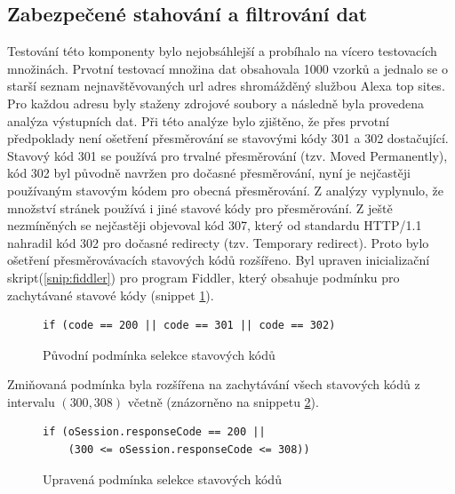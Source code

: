 \documentclass[thesis=M,czech,hidelinks]{FITthesis}[2013/05/06]
\begin{document}
\subsection{Zabezpečené stahování a filtrování dat}
Testování této komponenty bylo nejobsáhlejší a probíhalo na vícero testovacích množinách. Prvotní testovací množina dat obsahovala 1000 vzorků a jednalo se o starší seznam nejnavštěvovaných url adres shromážděný službou Alexa top sites\cite{alexa}. Pro každou adresu byly staženy zdrojové soubory a následně byla provedena analýza výstupních dat. Při této analýze bylo zjištěno, že přes prvotní předpoklady není ošetření přesměrování se stavovými kódy 301 a 302 dostačující. Stavový kód 301 se používá pro trvalné přesměrování (tzv. Moved Permanently), kód 302 byl původně navržen pro dočasné přesměrování, nyní je nejčastěji používaným stavovým kódem pro obecná přesměrování. Z analýzy vyplynulo, že množství stránek používá i jiné stavové kódy pro přesměrování. Z ještě nezmíněných se nejčastěji objevoval kód 307, který od standardu HTTP/1.1 nahradil kód 302 pro dočasné redirecty (tzv. Temporary redirect). Proto bylo ošetření přesměrovávacích stavových kódů rozšířeno. Byl upraven inicializační skript(\ref{snip:fiddler}) pro program Fiddler, který obsahuje podmínku pro zachytávané stavové kódy (snippet \ref{snip:fiddler_new}). 

\begin{figure}[h]               
	\begin{verbatim}
if (code == 200 || code == 301 || code == 302)
	\end{verbatim}      
	\caption{Původní podmínka selekce stavových kódů}
	\label{snip:fiddler_new}
\end{figure}

Zmiňovaná podmínka byla rozšířena na zachytávání všech stavových kódů z intervalu $(300,308)$ včetně (znázorněno na snippetu \ref{snip:fiddler_new_new}).
\begin{figure}[h]               
	\begin{verbatim}
if (oSession.responseCode == 200 || 
    (300 <= oSession.responseCode <= 308))
	\end{verbatim}      
	\caption{Upravená podmínka selekce stavových kódů}
	\label{snip:fiddler_new_new}
\end{figure}
\end{document}
